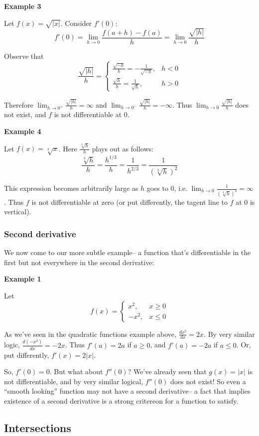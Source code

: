 \vs

\textbf{Example 3}

Let $f(x)=\sqrt{|x|}$. Consider $f'(0)$:
\[f'(0)=\lim_{h\to0}\frac{f(a+h)-f(a)}{h}=\lim_{h\to0}\frac{\sqrt{|h|}}{h}\]

Observe that
\[\frac{\sqrt{|h|}}{h}=\begin{cases}
  \frac{\sqrt{-h}}{h}=-\frac{1}{\sqrt{-h}},&h<0\\
  \frac{\sqrt{h}}{h}=\frac{1}{\sqrt{h}},&h>0
\end{cases}\]

Therefore $\lim_{h\to0^+}\frac{\sqrt{|h|}}{h}=\infty$ and
$\lim_{h\to0^-}\frac{\sqrt{|h|}}{h}=-\infty$. Thus
$\lim_{h\to0}\frac{\sqrt{|h|}}{h}$ does not exist, and $f$ is not
differentiable at $0$.

\vs

\textbf{Example 4}

Let $f(x)=\sqrt[3]{x}$. Here $\frac{\sqrt[3]{h}}{h}$ plays out as
follows:
\[\frac{\sqrt[3]{h}}{h}=\frac{h^{1/3}}{h}=\frac{1}{h^{2/3}}=\frac{1}{{(\sqrt[3]{h})}^2}\]

This expression becomes arbitrarily large as $h$ goes to $0$, i.e.
$\lim_{h\to0}\frac{1}{{(\sqrt[3]{h})}^2}=\infty$. Thus $f$ is not
differentiable at zero (or put differently, the tagent line to $f$ at
$0$ is vertical).


\subsubsection*{Second derivative}
We now come to our more subtle example-- a function that's
differentiable in the first but not everywhere in the second
derivative:

\vs

\textbf{Example 1}

Let
\[f(x)=\begin{cases}
  x^2,&x\geq0\\
  -x^2,&x\leq0
\end{cases}\]

As we've seen in the quadratic functions example above,
$\frac{dx^2}{dx}=2x$. By very similar logic, $\frac{d(-x^2)}{dx}=-2x$.
Thus $f'(a)=2a$ if $a\geq0$, and $f'(a)=-2a$ if $a\leq0$. Or, put
differently, $f'(x)=2|x|$.

\vs

So, $f'(0)=0$. But what about $f''(0)$? We've already seen that
$g(x)=|x|$ is not differentiable, and by very similar logical,
$f''(0)$ does not exist! So even a ``smooth looking'' function may not
have a second derivative-- a fact that implies existence of a second
derivative is a strong critereon for a function to satisfy.

\subsection{Intersections}

